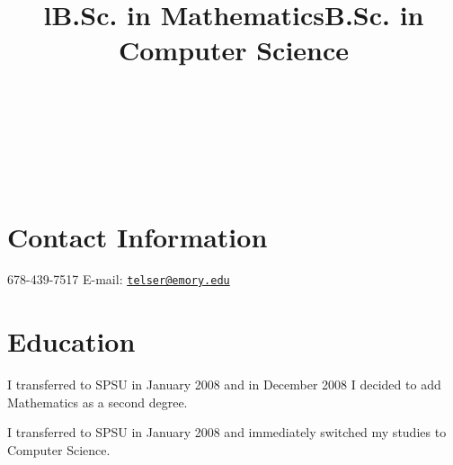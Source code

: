 \documentclass[margintitle,line]{res}
\begin{document}

\begin{resume}

\begin{format}
\\
\title{l}\\
\body\\
\end{format}



\section{Contact Information}

678-439-7517 \hfill {E-mail:} \href{mailto:telser@emory.edu}{\nolinkurl{telser@emory.edu}} \\


\section{Education}

\title{B.Sc. in Mathematics}
\begin{position}
   I transferred to SPSU in January 2008 and in December 2008 I decided to add Mathematics as a second degree.
\end{position}

\title{B.Sc. in Computer Science}
\begin{position}
  I transferred to SPSU in January 2008 and immediately switched my studies to Computer Science.
\end{position}


\end{resume}
\end{document}
